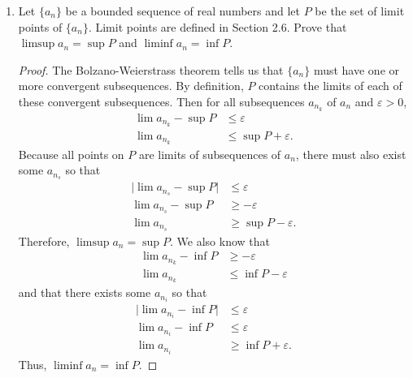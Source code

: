 \documentclass{article}
\begin{document}
\begin{enumerate}
\begin{enumerate}
\begin{proof}
\begin{align*}
                                    \limsup a_nc_n & \neq c\limsup a_n
                              \end{align*}
                              Alas! \eqref{eq:6.1_5_given} is not always true when $c<0$
                        \end{proof}
            \end{enumerate}
            \setcounter{enumi}{8}
      \item Let $\{a_n\}$ be a bounded sequence of real numbers and
            let $P$ be the set of limit points of $\{a_n\}$. Limit
            points are defined in Section 2.6. Prove that
            $\limsup a_n=\sup P$ and $\liminf a_n=\inf P$.
            \begin{proof}
                  The Bolzano-Weierstrass theorem tells us that $\{a_n\}$ must
                  have one or more convergent subsequences. By definition, $P$
                  contains the limits of each of these convergent subsequences.
                  Then for all subsequences $a_{n_k}$ of $a_n$ and $\varepsilon>0$,
                  \begin{align*}
                        \lim a_{n_k} - \sup P & \leq \varepsilon           \\
                        \lim a_{n_k}          & \leq \sup P + \varepsilon.
                  \end{align*}
                  Because all points on $P$ are limits of subsequences of $a_n$,
                  there must also exist some $a_{n_s}$ so that
                  \begin{align*}
                        \lvert\lim a_{n_s} - \sup P\rvert & \leq \varepsilon           \\
                        \lim a_{n_s} - \sup P             & \geq -\varepsilon          \\
                        \lim a_{n_s}                      & \geq \sup P - \varepsilon.
                  \end{align*}
                  Therefore, $\limsup a_n=\sup P$.
                  \medbreak
                  We also know that
                  \begin{align*}
                        \lim a_{n_k} - \inf P & \geq -\varepsilon         \\
                        \lim a_{n_k}          & \leq \inf P - \varepsilon
                  \end{align*}
                  and that there exists some $a_{n_i}$ so that
                  \begin{align*}
                        \lvert\lim a_{n_i} - \inf P\rvert & \leq \varepsilon           \\
                        \lim a_{n_i} - \inf P             & \leq \varepsilon           \\
                        \lim a_{n_i}                      & \geq \inf P + \varepsilon.
                  \end{align*}
                  Thus, $\liminf a_n=\inf P$.
            \end{proof}
\end{enumerate}
\end{document}
